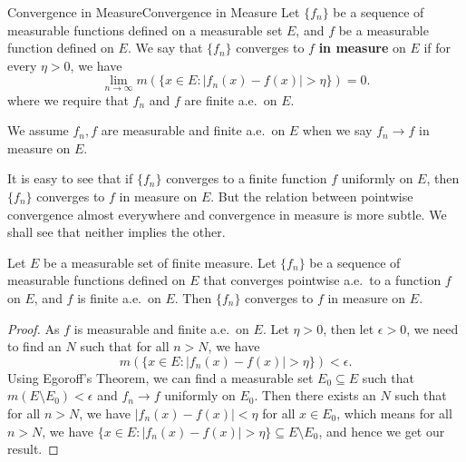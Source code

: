\documentclass[../main.tex]{subfiles}
\begin{document}
\begin{definition}{Convergence in Measure}{Convergence in Measure}
	Let $\{ f_n \}$ be a sequence of measurable functions defined on a measurable set $E$, and $f$ be a measurable function defined on $E$. We say that $\{ f_n \}$ converges to $f$ \textbf{in measure} on $E$ if for every $\eta > 0$, we have
	\begin{equation}
		\lim_{n \to \infty} m(\{ x \in E : |f_n(x) - f(x)| > \eta \}) = 0.
	\end{equation}
	where we require that $f_n$ and $f$ are finite a.e.\ on $E$.
\end{definition}

\begin{remark}
	We assume $f_n,f$ are measurable and finite a.e.\ on $E$ when we say $f_n \to f$ in measure on $E$.
\end{remark}

It is easy to see that if $\{ f_n \}$ converges to a finite function $f$ uniformly on $E$, then $\{ f_n \}$ converges to $f$ in measure on $E$. But the relation between pointwise convergence almost everywhere and convergence in measure is more subtle. We shall see that neither implies the other.

\begin{proposition}{}{}
	Let $E$ be a measurable set of finite measure. Let $\{ f_n \}$ be a sequence of measurable functions defined on $E$ that converges pointwise a.e.\ to a function $f$ on $E$, and $f$ is finite a.e.\ on $E$. Then $\{ f_n \}$ converges to $f$ in measure on $E$.
\end{proposition}
\begin{proof}
	As $f$ is measurable and finite a.e.\ on $E$. Let $\eta > 0$, then let $\epsilon > 0$, we need to find an $N$ such that for all $n > N$, we have
	\begin{equation*}
		m(\{ x \in E : |f_n(x) - f(x)| > \eta \}) < \epsilon.
	\end{equation*}
	Using Egoroff's Theorem, we can find a measurable set $E_0 \subseteq E$ such that $m(E \setminus E_0) < \epsilon$ and $f_n \to f$ uniformly on $E_0$. Then there exists an $N$ such that for all $n > N$, we have $|f_n(x) - f(x)| < \eta$ for all $x \in E_0$, which means for all $n > N$, we have $\{ x \in E : |f_n(x) - f(x)| > \eta \} \subseteq E \setminus E_0$, and hence we get our result.
\end{proof}
\end{document}
